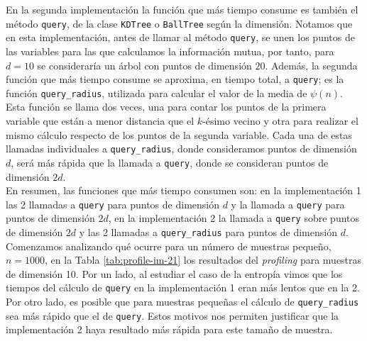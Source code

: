 \documentclass[12pt,a4paper]{report} %
\theoremstyle{definition}
\begin{document}
En la segunda implementación la función que más tiempo consume es también el método \texttt{query}, de la clase \texttt{KDTree} o \texttt{BallTree} según la dimensión. Notamos que en esta implementación, antes de llamar al método \texttt{query}, se unen los puntos de las variables para las que calculamos la información mutua, por tanto, para $d=10$ se consideraría un árbol con puntos de dimensión $20$. Además, la segunda función que más tiempo consume se aproxima, en tiempo total, a \texttt{query}; es la función  \texttt{query\_radius}, utilizada para calcular el valor de la media de $\psi(n)$. Esta función se llama dos veces, una para contar los puntos de la primera variable que están a menor distancia que el $k$-ésimo vecino y otra para realizar el mismo cálculo respecto de los puntos de la segunda variable. Cada una de estas llamadas individuales a \texttt{query\_radius}, donde consideramos puntos de dimensión $d$, será más rápida que la llamada a \texttt{query}, donde se consideran puntos de dimensión $2d$.\\

En resumen, las funciones que más tiempo consumen son: en la implementación 1 las 2 llamadas a \texttt{query} para puntos de dimensión $d$ y la llamada a \texttt{query} para puntos de dimensión $2d$, en la implementación 2 la llamada a \texttt{query} sobre puntos de dimensión $2d$ y las 2 llamadas a \texttt{query\_radius} para puntos de dimensión $d$.\\

Comenzamos analizando qué ocurre para un número de muestras pequeño, $n=1000$, en la Tabla \ref{tab:profile-im-21} los resultados del \textit{profiling} para muestras de dimensión 10. Por un lado, al estudiar el caso de la entropía vimos que los tiempos del cálculo de \texttt{query} en la implementación 1 eran más lentos que en la 2. Por otro lado, es posible que para muestras pequeñas el cálculo de \texttt{query\_radius} sea más rápido que el de \texttt{query}. Estos motivos nos permiten justificar que la implementación 2 haya resultado más rápida para este tamaño de muestra.\\
\end{document}
